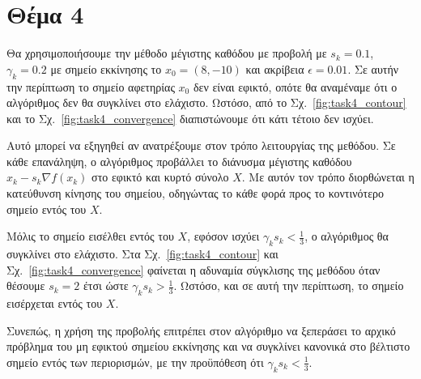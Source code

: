 \documentclass[a4paper,12pt]{article}
\begin{document}
\section*{Θέμα 4}
Θα χρησιμοποιήσουμε την μέθοδο μέγιστης καθόδου με προβολή με $s_k = 0.1$, $\gamma_k = 0.2$ με σημείο εκκίνησης το 
$x_0 = (8, -10)$ και ακρίβεια $\epsilon = 0.01$. Σε αυτήν την περίπτωση το σημείο αφετηρίας $x_0$ δεν είναι εφικτό,
οπότε θα αναμέναμε ότι ο αλγόριθμος δεν θα συγκλίνει στο ελάχιστο. Ωστόσο, από το Σχ.~\ref{fig:task4_contour} και το
Σχ.~\ref{fig:task4_convergence} διαπιστώνουμε ότι κάτι τέτοιο δεν ισχύει.

Αυτό μπορεί να εξηγηθεί αν ανατρέξουμε στον τρόπο λειτουργίας της μεθόδου. Σε κάθε επανάληψη, ο αλγόριθμος προβάλλει
το διάνυσμα μέγιστης καθόδου $x_k - s_k \nabla f(x_k)$ στο εφικτό και κυρτό σύνολο $X$. Με αυτόν τον τρόπο διορθώνεται 
η κατεύθυνση κίνησης του σημείου, οδηγώντας το κάθε φορά προς το κοντινότερο σημείο εντός του $X$.

Μόλις το σημείο εισέλθει εντός του $X$, εφόσον ισχύει $\gamma_k s_k < \frac{1}{3}$, ο αλγόριθμος θα συγκλίνει στο 
ελάχιστο. Στα Σχ.~\ref{fig:task4_contour} και Σχ.~\ref{fig:task4_convergence} φαίνεται η αδυναμία σύγκλισης της μεθόδου
όταν θέσουμε $s_k = 2$ έτσι ώστε $\gamma_k s_k > \frac{1}{3}$. Ωστόσο, και σε αυτή την περίπτωση, το σημείο εισέρχεται
εντός του $X$.

Συνεπώς, η χρήση της προβολής επιτρέπει στον αλγόριθμο να ξεπεράσει το αρχικό πρόβλημα του μη εφικτού σημείου εκκίνησης 
και να συγκλίνει κανονικά στο βέλτιστο σημείο εντός των περιορισμών, με την προϋπόθεση ότι $\gamma_k s_k < \frac{1}{3}$.
\end{document}
